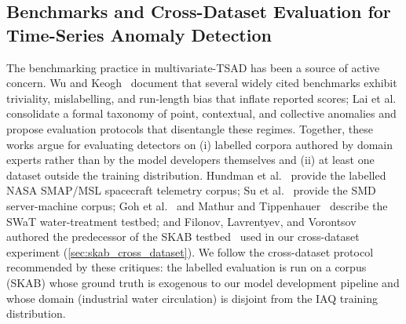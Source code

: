 \subsection{Benchmarks and Cross-Dataset Evaluation for Time-Series Anomaly Detection}

The benchmarking practice in multivariate-TSAD has been a source of active concern. Wu and Keogh~\cite{wu2021current} document that several widely cited benchmarks exhibit triviality, mislabelling, and run-length bias that inflate reported scores; Lai et al.~\cite{lai2021revisiting} consolidate a formal taxonomy of point, contextual, and collective anomalies and propose evaluation protocols that disentangle these regimes. Together, these works argue for evaluating detectors on (i) labelled corpora authored by domain experts rather than by the model developers themselves and (ii) at least one dataset outside the training distribution. Hundman et al.~\cite{hundman2018detecting} provide the labelled NASA SMAP/MSL spacecraft telemetry corpus; Su et al.~\cite{su2019robust} provide the SMD server-machine corpus; Goh et al.~\cite{goh2017dataset} and Mathur and Tippenhauer~\cite{mathur2016swat} describe the SWaT water-treatment testbed; and Filonov, Lavrentyev, and Vorontsov~\cite{filonov2016multivariate} authored the predecessor of the SKAB testbed~\cite{skab_dataset} used in our cross-dataset experiment (\cref{sec:skab_cross_dataset}). We follow the cross-dataset protocol recommended by these critiques: the labelled evaluation is run on a corpus (SKAB) whose ground truth is exogenous to our model development pipeline and whose domain (industrial water circulation) is disjoint from the IAQ training distribution.

